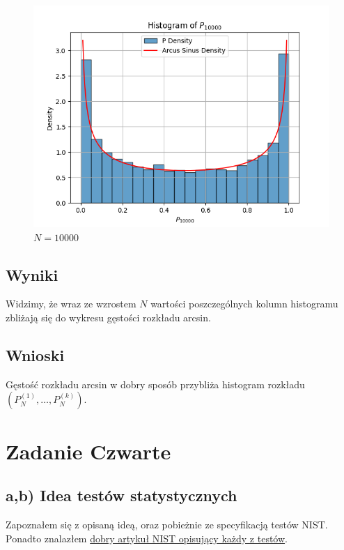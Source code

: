 \documentclass{article}
\begin{document}
\begin{figure}[H]
\begin{minipage}{0.24\textwidth}
        \includegraphics[width=\linewidth]{ex3/ex3_10000.png}
        \caption{$N=10000$}
    \end{minipage}
\end{figure}


\subsection{Wyniki}

Widzimy, że wraz ze wzrostem $N$ wartości poszczególnych kolumn histogramu zbliżają się do wykresu gęstości rozkładu arcsin.

\subsection{Wnioski}

Gęstość rozkładu arcsin w dobry sposób przybliża histogram rozkładu $(P_N^{(1)},\dots,P_N^{(k)})$. 

\section{Zadanie Czwarte}

\subsection{a,b) Idea testów statystycznych}

Zapoznałem się z opisaną ideą, oraz pobieżnie ze specyfikacją testów NIST. Ponadto znalazłem 
\href{https://csrc.nist.gov/projects/random-bit-generation/documentation-and-software/guide-to-the-statistical-tests}{dobry artykuł NIST opisujący każdy z testów}.
\end{document}
